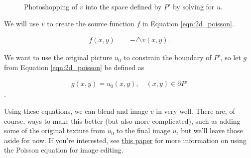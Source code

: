 \begin{figure}[H]
\begin{center}
\end{center}
  \caption{Photoshopping of $v$ into the space defined by $P'$ by solving for $u$.}
  \label{figure:photoshop_eqn}
\end{figure}

We will use $v$ to create the source function $f$ in Equation \eqref{eqn:2d_poisson}.

\begin{align}
f(x,y) &= -\triangle v(x,y).
\label{eqn:photoshop_step1}
\end{align}

We want to use the original picture $u_0$ to constrain the boundary of $P'$, so let $g$ from Equation \eqref{eqn:2d_poisson} be defined as

\begin{align}
g(x,y) = u_0(x,y), \quad (x,y)\in \partial P'
\end{align}.

Using these equations, we can blend and image $v$ in very well. There are, of course, ways to make this better (but also more complicated), such as adding some of the original texture from $u_0$ to the final image $u$, but we'll leave those aside for now.
If you're interested, see \href{https://www.cs.jhu.edu/~misha/Fall07/Papers/Perez03.pdf}{this paper} for more information on using the Poisson equation for image editing.

